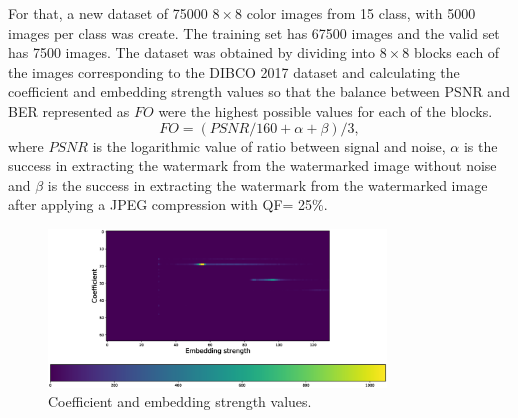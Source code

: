\documentclass[runningheads]{llncs}
\begin{document}
For that, a new dataset of 75000 $8\times 8$ color images from 15 class, with 5000 images per class was create. The training set has 67500 images and the valid set has 7500 images. The dataset was obtained by dividing into $8\times 8$ blocks each of the images corresponding to the DIBCO 2017 dataset and calculating the coefficient and embedding strength values so that the balance between PSNR and BER represented as $FO$ were the highest possible values for each of the blocks.
\begin{equation}
FO = (PSNR/160 + \alpha + \beta)/3,
\label{FA}
\end{equation}
where $PSNR$ is the logarithmic value of ratio between signal and noise, $ \alpha $ is the success in extracting the watermark from the watermarked image without noise and $ \beta $ is the success in extracting the watermark from the watermarked image after applying a JPEG compression with QF= 25{\%}.
\begin{figure} [H]
	\begin{center}
		\includegraphics[width=0.8\textwidth]{colorbar.eps}
		\caption{Coefficient and embedding strength values.} \label{colormap}
	\end{center}
\end{figure}
\end{document}
